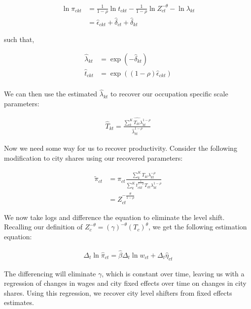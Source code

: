 \documentclass[10pt]{article}
\begin{document}
\begin{align*}
    \ln \pi_{ckt} & = \frac{1}{1 - \rho} \ln t_{ckt} - \frac{1}{1 - \rho} \ln Z_{ct}^{- \theta} - \ln \lambda_{kt} \\
                  & = \hat{\epsilon}_{ckt} + \hat{\delta}_{ct} + \hat{\delta}_{kt}
\end{align*}

such that,

\begin{align*}
    \hat{\lambda}_{kt} & = \exp \left( - \hat{\delta}_{kt} \right)             \\
    \hat{t}_{ckt}      & = \exp \left( (1 - \rho) \hat{\epsilon}_{ckt} \right) \\
\end{align*}

We can then use the estimated $\hat{\lambda}_{kt}$ to recover our occupation specific scale parameters:

\begin{align*}
    \hat{T}_{kt} = \frac{\widehat{\sum_{k}^{K} T_{kt} \lambda_{kt}^{1 - \rho}}}{\hat{\lambda}_{kt}^{1 - \rho}}
\end{align*}

Now we need some way for us to recover productivity. Consider the following modification to city shares using our recovered parameters:

\begin{align*}
    \tilde{\pi}_{ct} & = \pi_{ct} \frac{\sum_{k}^{K} T_{kt} \lambda_{kt}^{- \rho}}{\sum_{k}^{K} t_{ckt}^{\frac{1}{1 - \rho}} T_{kt} \lambda_{kt}^{1 - \rho}} \\
                     & = Z_{ct}^{- \frac{\theta}{1 - \rho}}
\end{align*}

We now take logs and difference the equation to eliminate the level shift. Recalling our definition of $Z_c^{- \theta} = (\gamma)^{- \theta} (T_c)^{\theta}$, we get the following estimation equation:

\begin{align*}
    \Delta_t \ln \hat{\pi}_{ct} = \hat{\beta} \Delta_t \ln w_{ct} + \Delta_t \hat{\eta}_{ct}
\end{align*}

The differencing will eliminate $\gamma$, which is constant over time, leaving us with a regression of changes in wages and city fixed effects over time on changes in city shares. Using this regression, we recover city level shifters from fixed effects estimates.
\end{document}
